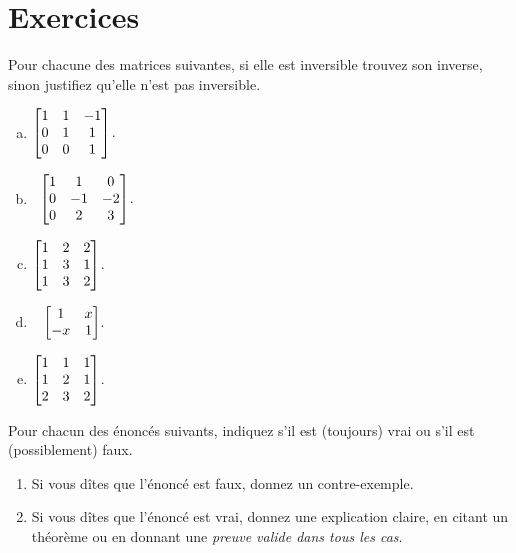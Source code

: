 \section*{Exercices}


\begin{prob} \label{prob18.1} Pour chacune des matrices suivantes, si elle est inversible trouvez son inverse, sinon justifiez qu'elle n'est pas inversible.
\medskip
\begin{enumerate}[a)]
\item $\bmatrix 1&1&-1\\
0&1&1\\
0&0&1\endbmatrix$.
\medskip
\item\sov~$\bmatrix1&1&0\\
0&-1&-2\\
0&2&3\endbmatrix$.
\medskip
\item $\bmatrix 1 & 2 & 2\\ 1 & 3 & 1\\ 1 & 3 & 2\endbmatrix$.
\medskip
%
\item\sov~ $\bmatrix  1&x\\ -x&1\endbmatrix$.
\medskip
\item 
\medskip $\bmatrix
1&1&1\\ 1&2&1\\2&3&2 \endbmatrix$.

\end{enumerate}

 
\end{prob} \begin{prob} \label{prob18.2}  Pour chacun des énoncés suivants, indiquez s'il est (toujours) vrai ou s'il est (possiblement) faux.   
   \smallskip    
\begin{enumerate}[$\bullet$]
\item Si vous dîtes que l'\'enonc\'e est faux, donnez un contre-exemple.   
\item Si vous dîtes que l'\'enonc\'e est vrai, donnez une explication claire, en citant un théorème ou en donnant une {\it preuve valide dans tous les cas}. 
\end{enumerate}


\end{prob}
